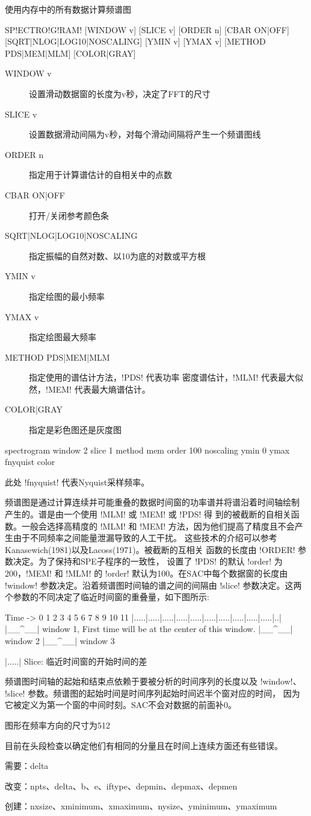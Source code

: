 \label{cmd:spectrogram}

使用内存中的所有数据计算频谱图

\begin{SACSTX}
SP!ECTRO!G!RAM! [WINDOW v] [SLICE v] [ORDER n] [CBAR ON|OFF]
    [SQRT|NLOG|LOG10|NOSCALING] [YMIN v] [YMAX v] [METHOD PDS|MEM|MLM]
    [COLOR|GRAY]
\end{SACSTX}

\begin{description}
\item [WINDOW v] 设置滑动数据窗的长度为v秒，决定了FFT的尺寸
\item [SLICE v] 设置数据滑动间隔为v秒，对每个滑动间隔将产生一个频谱图线
\item [ORDER n] 指定用于计算谱估计的自相关中的点数
\item [CBAR ON|OFF] 打开/关闭参考颜色条
\item [SQRT|NLOG|LOG10|NOSCALING] 指定振幅的自然对数、以10为底的对数或平方根
\item [YMIN v] 指定绘图的最小频率
\item [YMAX v] 指定绘图最大频率
\item [METHOD PDS|MEM|MLM] 指定使用的谱估计方法，!PDS! 代表功率
    密度谱估计，!MLM! 代表最大似然，!MEM! 代表最大熵谱估计。
\item [COLOR|GRAY] 指定是彩色图还是灰度图
\end{description}

\begin{SACDFT}
spectrogram window 2 slice 1 method mem order 100 noscaling
    ymin 0 ymax fnyquist color
\end{SACDFT}
此处 !fnyquist! 代表Nyquist采样频率。

频谱图是通过计算连续并可能重叠的数据时间窗的功率谱并将谱沿着时间轴绘制
产生的。谱是由一个使用 !MLM! 或 !MEM! 或 !PDS! 得
到的被截断的自相关函数。一般会选择高精度的 !MLM! 和 !MEM!
方法，因为他们提高了精度且不会产生由于不同频率之间能量泄漏导致的人工干扰。
这些技术的介绍可以参考Kanasewich(1981)以及Lacoss(1971)。被截断的互相关
函数的长度由 !ORDER! 参数决定。为了保持和SPE子程序的一致性，
设置了 !PDS! 的默认 !order! 为200，!MEM! 和
!MLM! 的 !order! 默认为100。在SAC中每个数据窗的长度由
!window! 参数决定。沿着频谱图时间轴的谱之间的间隔由 !slice!
参数决定。这两个参数的不同决定了临近时间窗的重叠量，如下图所示:
\begin{SACCode}
Time ->
0  1  2  3  4  5  6  7  8  9 10 11
|.....|.....|.....|.....|.....|.....|.....|.....|.....|.....|..|
|__^__| window 1, First time will be at the center of this window.
      |__^__| window 2
            |__^__| window 3

|.....| Slice: 临近时间窗的开始时间的差
\end{SACCode}
频谱图时间轴的起始和结束点依赖于要被分析的时间序列的长度以及 !window!、
!slice! 参数。频谱图的起始时间是时间序列起始时间迟半个窗对应的时间，
因为它被定义为第一个窗的中间时刻。SAC不会对数据的前面补0。

图形在频率方向的尺寸为512

目前在头段检查以确定他们有相同的分量且在时间上连续方面还有些错误。

需要：delta

改变：npts、delta、b、e、iftype、depmin、depmax、depmen

创建：nxsize、xminimum、xmaximum、nysize、yminimum、ymaximum
